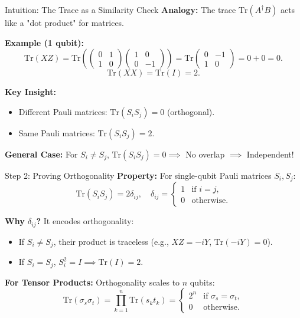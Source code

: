 \documentclass[aspectratio=169,xcolor=dvipsnames]{beamer}
\begin{document}
\begin{frame}{Intuition: The Trace as a Similarity Check}
\small
\textbf{Analogy:} The trace \(\text{Tr}(A^\dagger B)\) acts like a "dot product" for matrices.

\vspace{0.2cm}
\textbf{Example (1 qubit):}
\[
\text{Tr}(X Z) = \text{Tr}\left(\begin{pmatrix} 0 & 1 \\ 1 & 0 \end{pmatrix}\begin{pmatrix} 1 & 0 \\ 0 & -1 \end{pmatrix}\right) = \text{Tr}\begin{pmatrix} 0 & -1 \\ 1 & 0 \end{pmatrix} = 0 + 0 = 0.
\]
\[
\text{Tr}(X X) = \text{Tr}(I) = 2.
\]

\vspace{0.2cm}
\textbf{Key Insight:}
\begin{itemize}
    \item Different Pauli matrices: \(\text{Tr}(S_i S_j) = 0\) (orthogonal).
    \item Same Pauli matrices: \(\text{Tr}(S_i S_j) = 2\).
\end{itemize}

\vspace{0.2cm}
\textbf{General Case:}
For \(S_i \neq S_j\), \(\text{Tr}(S_i S_j) = 0 \implies\) No overlap \(\implies\) Independent!
\end{frame}

\begin{frame}{Step 2: Proving Orthogonality}
\textbf{Property:} For single-qubit Pauli matrices \(S_i, S_j\):
\[
\text{Tr}(S_i S_j) = 2\delta_{ij}, \quad \delta_{ij} = \begin{cases} 1 & \text{if } i=j, \\ 0 & \text{otherwise.} \end{cases}
\]

\vspace{0.2cm}
\textbf{Why \(\delta_{ij}\)?} It encodes orthogonality:
\begin{itemize}
    \item If \(S_i \neq S_j\), their product is traceless (e.g., \(XZ = -iY\), \(\text{Tr}(-iY) = 0\)).
    \item If \(S_i = S_j\), \(S_i^2 = I \implies \text{Tr}(I) = 2\).
\end{itemize}

\vspace{0.2cm}
\textbf{For Tensor Products:} Orthogonality scales to \(n\) qubits:
\[
\text{Tr}(\sigma_s \sigma_t) = \prod_{k=1}^n \text{Tr}(s_k t_k) = 
\begin{cases}
2^n & \text{if } \sigma_s = \sigma_t, \\
0 & \text{otherwise.}
\end{cases}
\]
\end{frame}
\end{document}
